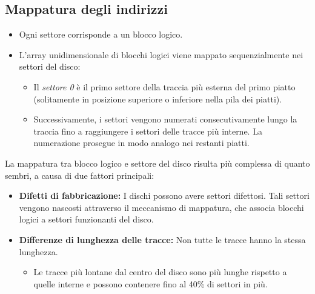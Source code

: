 
\subsection{Mappatura degli indirizzi}

\begin{itemize}
    \item Ogni settore corrisponde a un blocco logico.
    \item L’array unidimensionale di blocchi logici viene mappato sequenzialmente nei settori del disco:
    \begin{itemize}
        \item Il \textit{settore 0} è il primo settore della traccia più esterna del primo piatto (solitamente in posizione superiore o inferiore nella pila dei piatti).
        \item Successivamente, i settori vengono numerati consecutivamente lungo la traccia fino a raggiungere i settori delle tracce più interne. La numerazione prosegue in modo analogo nei restanti piatti.
    \end{itemize}
\end{itemize}

La mappatura tra blocco logico e settore del disco risulta più complessa di quanto sembri, a causa di due fattori principali:

\begin{itemize}
    \item \textbf{Difetti di fabbricazione:} I dischi possono avere settori difettosi. Tali settori vengono nascosti attraverso il meccanismo di mappatura, che associa blocchi logici a settori funzionanti del disco.
    \item \textbf{Differenze di lunghezza delle tracce:} Non tutte le tracce hanno la stessa lunghezza. 
    \begin{itemize}
        \item Le tracce più lontane dal centro del disco sono più lunghe rispetto a quelle interne e possono contenere fino al 40\% di settori in più.
    \end{itemize}
\end{itemize}

